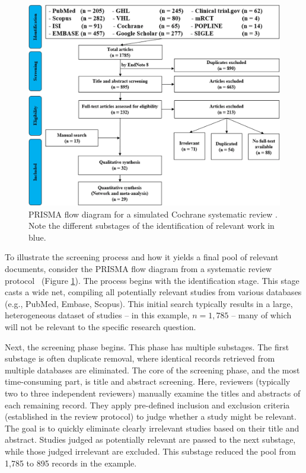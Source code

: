\documentclass[10pt,oneside]{book}
\begin{document}
\begin{figure}
    \centering
    \includegraphics[width=1\linewidth]{Confirmation Review//images/prisma_flow.png}
    \caption{PRISMA flow diagram for a simulated Cochrane systematic review \cite{tawfik_protocol_2020}. Note the different substages of the identification of relevant work in blue.\protect\footnotemark}
    \label{fig:prisma_flow}
\end{figure}

To illustrate the screening process and how it yields a final pool of relevant documents, consider the PRISMA flow diagram from a systematic review protocol~\cite{tawfik_protocol_2020} (Figure \ref{fig:prisma_flow}).  The process begins with the identification stage.  This stage casts a wide net, compiling all potentially relevant studies from various databases (e.g., PubMed, Embase, Scopus).  This initial search typically results in a large, heterogeneous dataset of studies – in this example, $n = 1{,}785$ – many of which will not be relevant to the specific research question.

Next, the screening phase begins. This phase has multiple substages. The first substage is often duplicate removal, where identical records retrieved from multiple databases are eliminated. The core of the screening phase, and the most time-consuming part, is title and abstract screening.  Here, reviewers (typically two to three independent reviewers) manually examine the titles and abstracts of each remaining record. They apply pre-defined inclusion and exclusion criteria (established in the review protocol) to judge whether a study might be relevant.  The goal is to quickly eliminate clearly irrelevant studies based on their title and abstract. Studies judged as potentially relevant are passed to the next substage, while those judged irrelevant are excluded. This substage reduced the pool from 1{,}785 to 895 records in the example.
\end{document}
